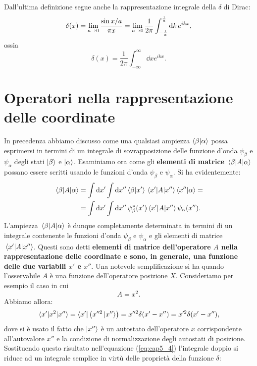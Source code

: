 Dall'ultima definizione segue anche la rappresentazione integrale della $\delta$ di Dirac:
\begin{equation}
  \delta\qty(x) = \lim_{a\to0}\frac{\sin{x/a}}{\pi x}=\lim_{a\to0}\frac{1}{2\pi}\int_{-\frac{1}{a}}^{\frac{1}{a}}\dd{k}e^{ikx} ,
\end{equation}
ossia
\begin{equation}
  \delta(x)=\frac{1}{2\pi}\int_{-\infty}^{\infty}\dd{x}e^{ikx} .
\end{equation}
\section{Operatori nella rappresentazione delle coordinate}
In precedenza abbiamo discusso come una qualsiasi ampiezza $\braket{\beta}{\alpha}$ possa esprimersi in termini di un integrale di sovrapposizione delle funzione d'onda $\psi_{\beta}$ e $\psi_{\alpha}$ degli stati $\ket{\beta}$ e $\ket{\alpha}$.
Esaminiamo ora come gli \textbf{elementi di matrice} $\mel{\beta}{A}{\alpha}$ possano essere scritti usando le funzioni d'onda $\psi_{\beta}$ e $\psi_{\alpha}$. Si ha evidentemente:
\begin{align}
  \label{eq:cap5_4}
  \mel{\beta}{A}{\alpha} &= \int\dd{x'}\int\dd{x''}\braket{\beta}{x'}\mel{x'}{A}{x''}\braket{x''}{\alpha} =\nonumber\\
  &= \int\dd{x'}\int\dd{x''} \psi_{\beta}^*\qty(x')\mel{x'}{A}{x''}\psi_{\alpha}\qty(x'') .
\end{align}
L'ampiezza $\mel{\beta}{A}{\alpha}$ è dunque completamente determinata in termini di un integrale contenente le funzioni d'onda $\psi_{\beta}$ e $\psi_{\alpha}$ e gli elementi di matrice $\mel{x'}{A}{x''}$. Questi sono detti \textbf{elementi di matrice dell'operatore $A$ nella rappresentazione delle coordinate e sono, in generale, una funzione delle due variabili $x'$ e $x''$}.
Una notevole semplificazione si ha quando l'osservabile $A$ è una funzione dell'operatore posizione $X$. Consideriamo per esempio il caso in cui
\begin{equation}
  A= x^2 .
\end{equation}
Abbiamo allora:
\begin{equation}
  \mel{x'}{x^2}{x''} = \bra{x'}\qty(x''^2\ket{x''}) = x''^2\delta\qty(x'-x'') = x'^2\delta\qty(x'-x'') ,
\end{equation}
dove si è usato il fatto che $\ket{x''}$ è un autostato dell'operatore $x$ corrispondente all'autovalore $x''$ e la condizione di normalizzazione degli autostati di posizione. Sostituendo questo risultato nell'equazione (\ref{eq:cap5_4}) l'integrale doppio si riduce ad un integrale semplice in virtù delle proprietà della funzione $\delta$:
